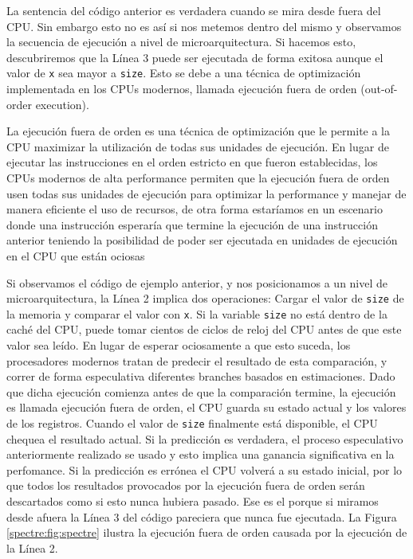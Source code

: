 La sentencia del código anterior es verdadera cuando se mira desde fuera del CPU. 
Sin embargo esto no es así si nos metemos dentro del mismo y observamos la secuencia de ejecución a nivel de microarquitectura. Si hacemos esto, descubriremos que la Línea 3 puede ser ejecutada de forma exitosa aunque el valor de \texttt{x} sea mayor a \texttt{size}. Esto se debe a una técnica de optimización implementada en los CPUs modernos, llamada ejecución fuera de orden (out-of-order execution).

La ejecución fuera de orden es una técnica de optimización que le permite a la CPU maximizar la utilización de todas sus unidades de ejecución. En lugar de ejecutar las instrucciones en el orden estricto en que fueron establecidas, los CPUs modernos de alta performance permiten que la ejecución fuera de orden usen todas sus unidades de ejecución para optimizar la performance y manejar de manera eficiente el uso de recursos, de otra forma estaríamos en un escenario donde una instrucción esperaría que termine la ejecución de una instrucción anterior teniendo la posibilidad de poder ser ejecutada en unidades de ejecución en el CPU que están ociosas

Si observamos el código de ejemplo anterior, y nos posicionamos a un nivel de microarquitectura, la Línea 2 implica dos operaciones: Cargar el valor de \texttt{size} de la memoria y comparar el valor con \texttt{x}. Si la variable  \texttt{size} no está dentro de la caché del CPU, puede tomar cientos de ciclos de reloj del CPU antes de que este valor sea leído.
En lugar de esperar ociosamente a que esto suceda, los procesadores modernos tratan de predecir el resultado de esta comparación, y correr de forma especulativa diferentes branches basados en estimaciones. Dado que dicha ejecución comienza antes de que la comparación termine, la ejecución es llamada ejecución fuera de orden, el CPU guarda su estado actual y los valores de los registros.
Cuando el valor de  \texttt{size} finalmente está disponible, el CPU chequea el resultado actual. Si la predicción es verdadera, el proceso especulativo anteriormente realizado se usado y esto implica una ganancia significativa en la perfomance. Si la predicción es errónea el CPU volverá a su estado inicial, por lo que todos los resultados provocados por la ejecución fuera de orden serán descartados como si esto nunca hubiera pasado. Ese es el porque si miramos desde afuera la Línea 3 del código pareciera que nunca fue ejecutada.
La Figura \ref{spectre:fig:spectre} ilustra la ejecución fuera de orden causada por la ejecución de la Línea 2.

